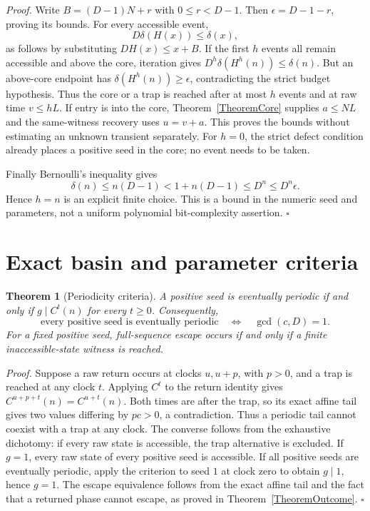\documentclass[11pt,letterpaper]{article}
\newtheorem{theorem}{Theorem}
\newenvironment{proof}{\noindent\textit{Proof.}}{\hfill\(\square\)}
\begin{document}
\begin{proof}
Write $B=(D-1)N+r$ with $0\le r<D-1$. Then
$\epsilon=D-1-r$, proving its bounds. For every accessible event,
\[
 D\delta(H(x))\le\delta(x),
\]
as follows by substituting $DH(x)\le x+B$.
If the first $h$ events all remain accessible and above the core, iteration
gives $D^h\delta(H^h(n))\le\delta(n)$. But an above-core endpoint has
$\delta(H^h(n))\ge\epsilon$, contradicting the strict budget hypothesis.
Thus the core or a trap is reached after at most $h$ events and at raw time
$v\le hL$. If entry is into the core, Theorem~\ref{TheoremCore} supplies
$a\le NL$ and the same-witness recovery uses $u=v+a$.
This proves the bounds without estimating an unknown transient separately.
For $h=0$, the strict defect condition already places a positive seed in the
core; no event needs to be taken.

Finally Bernoulli's inequality gives
\[
 \delta(n)\le n(D-1)<1+n(D-1)\le D^n\le D^n\epsilon.
\]
Hence $h=n$ is an explicit finite choice. This is a bound in the numeric
seed and parameters, not a uniform polynomial bit-complexity assertion.
\end{proof}

\section{Exact basin and parameter criteria}

\begin{theorem}[Periodicity criteria]\label{TheoremCoprime}
A positive seed is eventually periodic if and only if
$g\mid C^t(n)$ for every $t\ge0$. Consequently,
\[
 \text{every positive seed is eventually periodic}
 \quad\Longleftrightarrow\quad \gcd(c,D)=1.
\]
For a fixed positive seed, full-sequence escape occurs if and only if a
finite inaccessible-state witness is reached.
\end{theorem}

\begin{proof}
Suppose a raw return occurs at clocks $u,u+p$, with $p>0$, and a trap is
reached at any clock $t$. Applying $C^t$ to the return identity gives
$C^{u+p+t}(n)=C^{u+t}(n)$. Both times are after the trap, so its exact affine
tail gives two values differing by $pc>0$, a contradiction. Thus a periodic
tail cannot coexist with a trap at any clock. The converse follows from the
exhaustive dichotomy: if every raw state is accessible, the trap alternative
is excluded. If $g=1$, every raw state of every positive seed is accessible.
If all positive seeds are eventually periodic, apply the criterion to seed
$1$ at clock zero to obtain $g\mid1$, hence $g=1$.
The escape equivalence follows from the exact affine tail and the fact that
a returned phase cannot escape, as proved in Theorem~\ref{TheoremOutcome}.
\end{proof}
\end{document}
